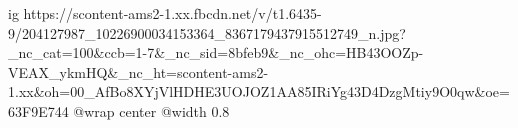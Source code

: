  
 
 
 
 

\ifcmt
  ig https://scontent-ams2-1.xx.fbcdn.net/v/t1.6435-9/204127987_10226900034153364_8367179437915512749_n.jpg?_nc_cat=100&ccb=1-7&_nc_sid=8bfeb9&_nc_ohc=HB43OOZp-VEAX_ykmHQ&_nc_ht=scontent-ams2-1.xx&oh=00_AfBo8XYjVlHDHE3UOJOZ1AA85IRiYg43D4DzgMtiy9O0qw&oe=63F9E744
  @wrap center
  @width 0.8
\fi
